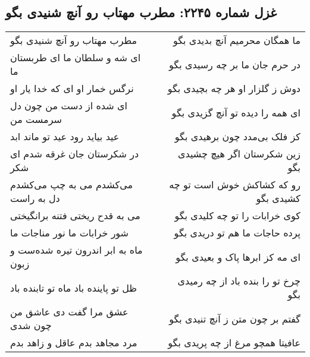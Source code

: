 \begin{center}
\section*{غزل شماره ۲۲۴۵: مطرب مهتاب رو آنچ شنیدی بگو}
\label{sec:2245}
\begin{longtable}{l p{0.5cm} r}
مطرب مهتاب رو آنچ شنیدی بگو
&&
ما همگان محرمیم آنچ بدیدی بگو
\\
ای شه و سلطان ما ای طربستان ما
&&
در حرم جان ما بر چه رسیدی بگو
\\
نرگس خمار او ای که خدا یار او
&&
دوش ز گلزار او هر چه بچیدی بگو
\\
ای شده از دست من چون دل سرمست من
&&
ای همه را دیده تو آنچ گزیدی بگو
\\
عید بیاید رود عید تو ماند ابد
&&
کز فلک بی‌مدد چون برهیدی بگو
\\
در شکرستان جان غرقه شدم ای شکر
&&
زین شکرستان اگر هیچ چشیدی بگو
\\
می‌کشدم می به چپ می‌کشدم دل به راست
&&
رو که کشاکش خوش است تو چه کشیدی بگو
\\
می به قدح ریختی فتنه برانگیختی
&&
کوی خرابات را تو چه کلیدی بگو
\\
شور خرابات ما نور مناجات ما
&&
پرده حاجات ما هم تو دریدی بگو
\\
ماه به ابر اندرون تیره شده‌ست و زبون
&&
ای مه کز ابرها پاک و بعیدی بگو
\\
ظل تو پاینده باد ماه تو تابنده باد
&&
چرخ تو را بنده باد از چه رمیدی بگو
\\
عشق مرا گفت دی عاشق من چون شدی
&&
گفتم بر چون متن ز آنچ تنیدی بگو
\\
مرد مجاهد بدم عاقل و زاهد بدم
&&
عافیتا همچو مرغ از چه پریدی بگو
\\
\end{longtable}
\end{center}
